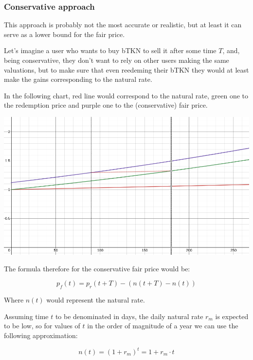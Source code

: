 \documentclass{article}
\begin{document}
\subsubsection{Conservative approach}
This approach is probably not the most accurate or realistic, but at least it can serve as a lower bound for the fair price.

Let’s imagine a user who wants to buy bTKN to sell it after some time $T$, and, being conservative, they don’t want to rely on other users making the same valuations, but to make sure that even reedeming their bTKN they would at least make the gains corresponding to the natural rate.

In the following chart, red line would correspond to the natural rate, green one to the redemption price and purple one to the (conservative) fair price.

\includegraphics[width=\linewidth]{./ChickenBonds_Whitepaper_conservative_price.png}

The formula therefore for the conservative fair price would be:

\begin{equation}
  \label{eq:conservative-1}
p_f(t) = p_r(t + T) - (n(t+T) - n(t))
\end{equation}

Where $n(t)$ would represent the natural rate.

Assuming time $t$ to be denominated in days, the daily natural rate $r_m$ is expected to be low, so for values of $t$ in the order of magnitude of a year we can use the following approximation:

\begin{equation}
  \label{eq:conservative_natural_approximation}
n(t) = (1 + r_m)^t = 1 + r_m \cdot t
\end{equation}
\end{document}
